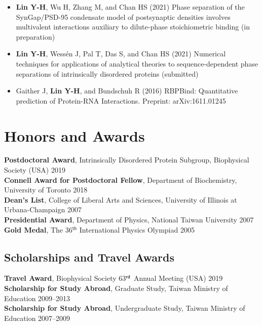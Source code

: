 \documentclass[11pt]{../yhlcv}
\def\tname#1{{\bf #1}}
\begin{document}
\begin{itemize}[leftmargin=*]

\item 
\tname{Lin Y-H}, Wu H, Zhang M, and Chan HS (2021)
Phase separation of the SynGap/PSD-95 condensate model of postsynaptic densities involves multivalent interactions auxiliary to dilute-phase stoichiometric binding (in preparation)

\item
\tname{Lin Y-H}, Wessén J, Pal T, Das S, and Chan HS (2021)
Numerical techniques for applications of analytical theories to sequence-dependent phase separations of intrinsically disordered proteins (submitted)

\item 
Gaither J, \tname{Lin Y-H}, and Bundschuh R (2016) 
RBPBind: Quantitative prediction of Protein-RNA Interactions. 
Preprint: arXiv:1611.01245 %

\end{itemize} 

\section*{Honors and Awards}

\noindent
{\bf Postdoctoral Award}, Intrinsically Disordered Protein Subgroup, Biophysical Society (USA) \hfill 2019 \\
{\bf Connell Award for Postdoctoral Fellow}, Department of Biochemistry, University of Toronto \hfill 2018 \\
{\bf Dean's List}, College of Liberal Arts and Sciences, University of Illinois at Urbana-Champaign \hfill 2007 \\
{\bf Presidential Award}, Department of Physics, National Taiwan University \hfill 2007 \\
{\bf Gold Medal}, The 36$^{ \mathsf{th}}$ International Physics Olympiad \hfill 2005

\subsection*{Scholarships and Travel Awards} 
{\bf Travel Award}, Biophysical Society 63$^{\sf rd}$ Annual Meeting (USA) \hfill 2019 \\
{\bf Scholarship for Study Abroad}, Graduate Study, Taiwan Ministry of Education \hfill 2009--2013 \\
{\bf Scholarship for Study Abroad}, Undergraduate Study, Taiwan Ministry of Education \hfill 2007--2009 
\end{document}
